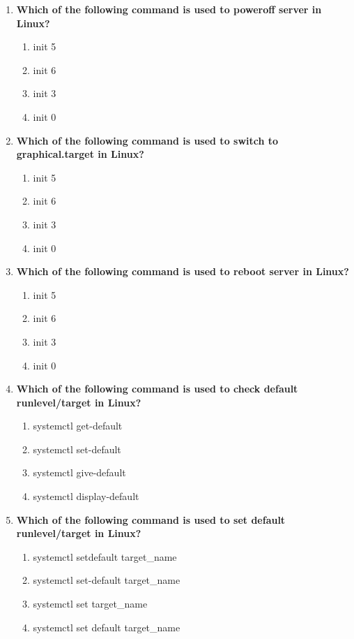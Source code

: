 \begin{flushleft}
\begin{enumerate}
		\item \textbf{Which of the following command is used to poweroff server in Linux?}
		\begin{enumerate}[label=(\alph*)]
			\item init 5 
			\item init 6 
			\item init 3 
			\item init 0  %
		\end{enumerate}
		\bigskip
		\bigskip

		\item \textbf{Which of the following command is used to switch to graphical.target in Linux?}
		\begin{enumerate}[label=(\alph*)]
			\item init 5   %
			\item init 6 
			\item init 3 
			\item init 0   
		\end{enumerate}
		\bigskip
		\bigskip

		\item \textbf{Which of the following command is used to reboot server in Linux?}
		\begin{enumerate}[label=(\alph*)]
			\item init 5  
			\item init 6   %
			\item init 3 
			\item init 0   
		\end{enumerate}
		\bigskip
		\bigskip

		\item \textbf{Which of the following command is used to check default runlevel/target in Linux?}
		\begin{enumerate}[label=(\alph*)]
			\item systemctl get-default  %
			\item systemctl set-default
			\item systemctl give-default
			\item systemctl display-default
		\end{enumerate}
		\bigskip
		\bigskip

		\item \textbf{Which of the following command is used to set default runlevel/target in Linux?}
		\begin{enumerate}[label=(\alph*)]
			\item systemctl setdefault  target\_name
			\item systemctl set-default  target\_name  %
			\item systemctl set target\_name
			\item systemctl set default target\_name
		\end{enumerate}
		\bigskip
		\bigskip
		
	\end{enumerate}
\end{flushleft}

\newpage

